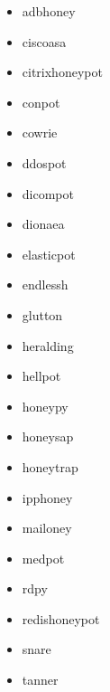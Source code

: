\begin{itemize}
    \item adbhoney \cite{adbhoney2021}
    \item ciscoasa \cite{cymmetria2018}
    \item citrixhoneypot \cite{citrixhoneypot2020}
    \item conpot \cite{conpot2021}
    \item cowrie \cite{cowire2021}
    \item ddospot \cite{ddosspot2021}
    \item dicompot \cite{dicompot2021}
    \item dionaea \cite{dionaea2021}
    \item elasticpot \cite{elasticpot2021}
    \item endlessh \cite{endlessh2021}
    \item glutton \cite{glutton2021}
    \item heralding \cite{heralding2021}
    \item hellpot \cite{hellpot2021}
    \item honeypy \cite{honeysap2021}
    \item honeysap \cite{honeysap2021}
    \item honeytrap \cite{honeytrap2021}
    \item ipphoney \cite{ipphoney2021}
    \item mailoney
    \item medpot \cite{medpot2021}
    \item rdpy \cite{rdpy2021}
    \item redishoneypot
    \item snare \cite{snare2021}
    \item tanner \cite{tanner2021}
\end{itemize}

